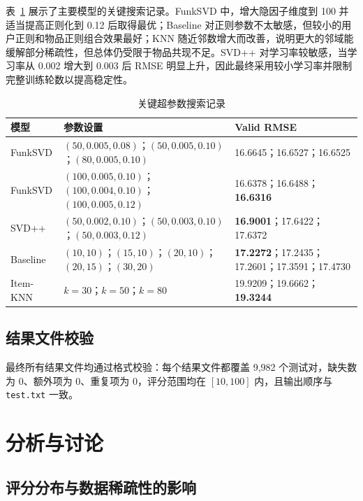 \documentclass[UTF8,a4paper,10pt]{ctexart}
\begin{document}
表~\ref{tab:grid_search} 展示了主要模型的关键搜索记录。FunkSVD 中，增大隐因子维度到 100 并适当提高正则化到 0.12 后取得最优；Baseline 对正则参数不太敏感，但较小的用户正则和物品正则组合效果最好；KNN 随近邻数增大而改善，说明更大的邻域能缓解部分稀疏性，但总体仍受限于物品共现不足。SVD++ 对学习率较敏感，当学习率从 0.002 增大到 0.003 后 RMSE 明显上升，因此最终采用较小学习率并限制完整训练轮数以提高稳定性。

\begin{table}[H]
    \centering
    \caption{关键超参数搜索记录}
    \label{tab:grid_search}
    \small
    \setlength{\tabcolsep}{3pt}
    \begin{tabular}{@{}p{}p{}p{}@{}}
        \toprule
        \textbf{模型} & \textbf{参数设置} & \textbf{Valid RMSE} \\
        \midrule
        FunkSVD & $(50,0.005,0.08)$；$(50,0.005,0.10)$；$(80,0.005,0.10)$ & 16.6645；16.6527；16.6525 \\
        FunkSVD & $(100,0.005,0.10)$；$(100,0.004,0.10)$；$(100,0.005,0.12)$ & 16.6378；16.6488；\textbf{16.6316} \\
        SVD++ & $(50,0.002,0.10)$；$(50,0.003,0.10)$；$(50,0.003,0.12)$ & \textbf{16.9001}；17.6422；17.6372 \\
        Baseline & $(10,10)$；$(15,10)$；$(20,10)$；$(20,15)$；$(30,20)$ & \textbf{17.2272}；17.2435；17.2601；17.3591；17.4730 \\
        Item-KNN & $k=30$；$k=50$；$k=80$ & 19.9209；19.6662；\textbf{19.3244} \\
        \bottomrule
    \end{tabular}
\end{table}

\subsection{结果文件校验}

最终所有结果文件均通过格式校验：每个结果文件都覆盖 9,982 个测试对，缺失数为 0、额外项为 0、重复项为 0，评分范围均在 $[10,100]$ 内，且输出顺序与 \texttt{test.txt} 一致。

\section{分析与讨论}

\subsection{评分分布与数据稀疏性的影响}
\end{document}
